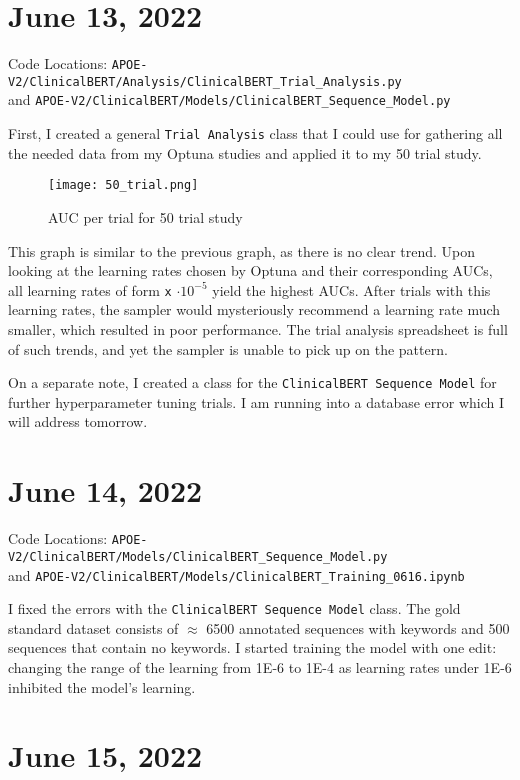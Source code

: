 \documentclass[11pt,letterpaper]{article}
\begin{document}
\section{June 13, 2022}

Code Locations: \texttt{APOE-V2/ClinicalBERT/Analysis/ClinicalBERT\_Trial\_Analysis.py} \\ and \texttt{APOE-V2/ClinicalBERT/Models/ClinicalBERT\_Sequence\_Model.py}

First, I created a general \texttt{Trial Analysis} class that I could use for gathering all the needed data from my Optuna studies and applied it to my 50 trial study.

\begin{figure}[h!]
\centering
\texttt{[image: 50\_trial.png]}
\caption{AUC per trial for 50 trial study}
\end{figure}

This graph is similar to the previous graph, as there is no clear trend. Upon looking at the learning rates chosen by Optuna and their corresponding AUCs, all learning rates of form \texttt{x} $\cdot 10^{-5}$ yield the highest AUCs. After trials with this learning rates, the sampler would mysteriously recommend a learning rate much smaller, which resulted in poor performance. The trial analysis spreadsheet is full of such trends, and yet the sampler is unable to pick up on the pattern.  

On a separate note, I created a class for the \texttt{ClinicalBERT Sequence Model} for further hyperparameter tuning trials. I am running into a database error which I will address tomorrow.

\section{June 14, 2022}

Code Locations: \texttt{APOE-V2/ClinicalBERT/Models/ClinicalBERT\_Sequence\_Model.py} \\ and \texttt{APOE-V2/ClinicalBERT/Models/ClinicalBERT\_Training\_0616.ipynb}

I fixed the errors with the \texttt{ClinicalBERT Sequence Model} class. The gold standard dataset consists of $\approx$ 6500 annotated sequences with keywords and 500 sequences that contain no keywords. I started training the model with one edit: changing the range of the learning from 1E-6 to 1E-4 as learning rates under 1E-6 inhibited the model's learning. 

\section{June 15, 2022}
\end{document}
